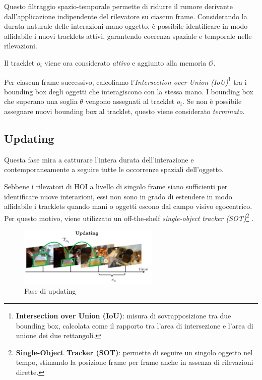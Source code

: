 Questo filtraggio spazio-temporale permette di ridurre il rumore derivante dall'applicazione indipendente del rilevatore su ciascun frame. Considerando la durata naturale delle interazioni mano-oggetto, è possibile identificare in modo affidabile i nuovi tracklets attivi, garantendo coerenza spaziale e temporale nelle rilevazioni.  

Il tracklet $o_i$ viene ora considerato \emph{attivo} e aggiunto alla memoria $\mathcal{O}$.  

Per ciascun frame successivo, calcoliamo l'\emph{Intersection over Union (IoU)}\footnote{\textbf{Intersection over Union (IoU)}: misura di sovrapposizione tra due bounding box, calcolata come il rapporto tra l'area di intersezione e l'area di unione dei due rettangoli.} tra i bounding box degli oggetti che interagiscono con la stessa mano. I bounding box che superano una soglia $\theta$ vengono assegnati al tracklet $o_i$. Se non è possibile assegnare nuovi bounding box al tracklet, questo viene considerato \emph{terminato}.

\subsection*{Updating}

Questa fase mira a catturare l'intera durata dell'interazione e contemporaneamente a seguire tutte le occorrenze spaziali dell'oggetto.

Sebbene i rilevatori di HOI a livello di singolo frame siano sufficienti per identificare nuove interazioni, essi non sono in grado di estendere in modo affidabile i tracklets quando mani o oggetti escono dal campo visivo egocentrico. Per questo motivo, viene utilizzato un off-the-shelf \emph{single-object tracker (SOT)}\footnote{\textbf{Single-Object Tracker (SOT)}: permette di seguire un singolo oggetto nel tempo, stimando la posizione frame per frame anche in assenza di rilevazioni dirette.} \cite{tang2023egotrackslongtermegocentricvisual}.  

\begin{figure}[ht]
    \centering
    \includegraphics[width=0.6\textwidth]{Images/update.png}
    \caption{Fase di updating}
    \label{fig:update}
\end{figure}

